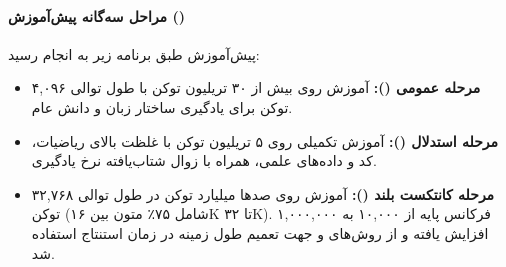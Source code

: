 \paragraph*{مراحل سه‌گانه پیش‌آموزش ()}
پیش‌آموزش طبق برنامه زیر به انجام رسید:
\begin{itemize}
    \item \textbf{مرحله عمومی ():} آموزش روی بیش از ۳۰ تریلیون توکن با طول توالی ۴,۰۹۶ توکن برای یادگیری ساختار زبان و دانش عام.
    \item \textbf{مرحله استدلال ():} آموزش تکمیلی روی ۵ تریلیون توکن با غلظت بالای ریاضیات، کد و داده‌های علمی، همراه با زوال شتاب‌یافته نرخ یادگیری.
    \item \textbf{مرحله کانتکست بلند ():} آموزش روی صدها میلیارد توکن در طول توالی ۳۲,۷۶۸ توکن (شامل ۷۵٪ متون بین ۱۶K تا ۳۲K). فرکانس پایه  از ۱۰,۰۰۰ به ۱,۰۰۰,۰۰۰ افزایش یافته و از روش‌های  \cite{peng2023yarn} و  جهت تعمیم طول زمینه در زمان استنتاج استفاده شد.
\end{itemize}